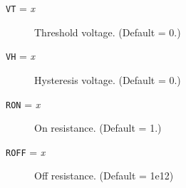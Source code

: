 \begin{description}

\item[{\tt VT} = {\it x}] Threshold voltage.  (Default = 0.)

\item[{\tt VH} = {\it x}] Hysteresis voltage.  (Default = 0.)

\item[{\tt RON} = {\it x}] On resistance.  (Default = 1.)

\item[{\tt ROFF} = {\it x}] Off resistance.  (Default = 1e12)

\end{description}
